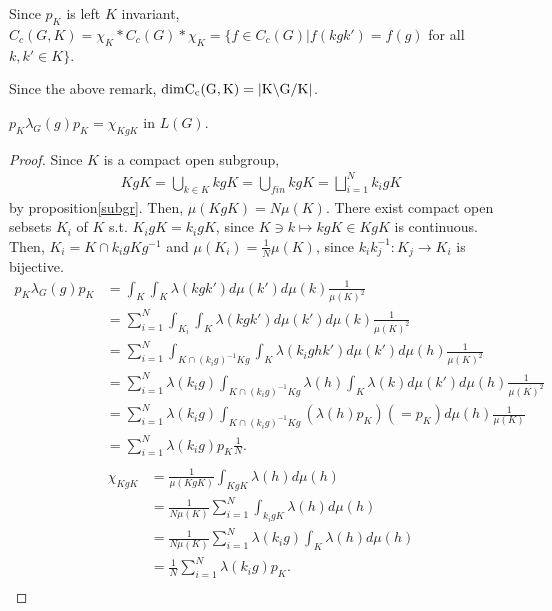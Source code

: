 \begin{remark}
  Since $p_K$ is left $K$ invariant, $C_c(G,K) = \chi_K * C_c(G) * \chi_K = \{f \in C_c(G) | f(kgk') = f(g)$ for all $k,k' \in K\}$.
\end{remark}

\begin{remark}
  Since the above remark, $\rm{dim}C_c(G,K) = |K \backslash G / K|$. 
\end{remark}

\begin{remark}
  $p_K \lambda_G(g) p_K = \chi_{KgK}$ in $L(G)$.
\end{remark}

\begin{proof}
  Since $K$ is a compact open subgroup, 
  \begin{align*}
    KgK = \bigcup_{k \in K} kgK = \bigcup_{fin} kgK = \bigsqcup^{N}_{i=1}k_igK
  \end{align*}
  by proposition\ref{subgr}.
  Then, $\mu(KgK)=N\mu(K)$.
  There exist compact open sebsets $K_i$ of $K$ s.t. $K_i g K = k_i g K$, since $K \ni k \mapsto kgK \in KgK$ is continuous.
  Then, $K_i = K \cap k_i g K g^{-1}$ and $\mu(K_i) = \frac{1}{N}\mu(K)$, since $k_i k_j^{-1}:K_j \rightarrow K_i$ is bijective.
  \begin{align*}
    p_K \lambda_G(g) p_K
    &= \int_K \int_K \lambda(kgk') d\mu(k') d\mu(k) \frac{1}{\mu(K)^2}\\
    &= \sum_{i=1}^N \int_{K_i} \int_K \lambda(kgk') d\mu(k') d\mu(k) \frac{1}{\mu(K)^2}\\
    &= \sum_{i=1}^N \int_{K \cap (k_i g)^{-1} K g} \int_K \lambda(k_ighk')d\mu(k') d\mu(h) \frac{1}{\mu(K)^2}\\
    &= \sum_{i=1}^N \lambda(k_ig)\int_{K \cap (k_i g)^{-1} K g} \lambda(h) \int_K \lambda(k)d\mu(k') d\mu(h) \frac{1}{\mu(K)^2}\\
    &= \sum_{i=1}^N \lambda(k_ig)\int_{K \cap (k_i g)^{-1} K g} (\lambda(h) p_K) (= p_K) d\mu(h) \frac{1}{\mu(K)}\\
    &= \sum_{i=1}^N \lambda(k_ig)p_K \frac{1}{N}.\\
  \end{align*}
  \begin{align*}
    \chi_{KgK}
    &=\frac{1}{\mu(KgK)} \int_{KgK} \lambda(h)d\mu(h)\\
    &= \frac{1}{N\mu(K)}\sum_{i=1}^N \int_{k_i gK} \lambda(h)d\mu(h)\\
    &= \frac{1}{N\mu(K)}\sum_{i=1}^N\lambda(k_ig) \int_{K} \lambda(h)d\mu(h)\\
    &= \frac{1}{N}\sum_{i=1}^N\lambda(k_ig) p_K.\\
  \end{align*}
\end{proof}

